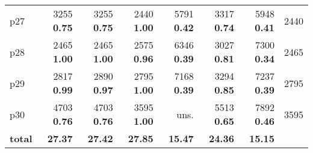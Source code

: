 \begin{tabular}{lrrrrrrr}
\multicolumn{1}{l|}{p27} & {\footnotesize 3255} \textbf{0.75} & {\footnotesize 3255} \textbf{0.75} & {\footnotesize 2440} \textbf{1.00} & {\footnotesize 5791} \textbf{0.42} & {\footnotesize 3317} \textbf{0.74} & {\footnotesize 5948} \textbf{0.41} & \multicolumn{1}{|r}{2440}\\
\multicolumn{1}{l|}{p28} & {\footnotesize 2465} \textbf{1.00} & {\footnotesize 2465} \textbf{1.00} & {\footnotesize 2575} \textbf{0.96} & {\footnotesize 6346} \textbf{0.39} & {\footnotesize 3027} \textbf{0.81} & {\footnotesize 7300} \textbf{0.34} & \multicolumn{1}{|r}{2465}\\
\multicolumn{1}{l|}{p29} & {\footnotesize 2817} \textbf{0.99} & {\footnotesize 2890} \textbf{0.97} & {\footnotesize 2795} \textbf{1.00} & {\footnotesize 7168} \textbf{0.39} & {\footnotesize 3294} \textbf{0.85} & {\footnotesize 7237} \textbf{0.39} & \multicolumn{1}{|r}{2795}\\
\multicolumn{1}{l|}{p30} & {\footnotesize 4703} \textbf{0.76} & {\footnotesize 4703} \textbf{0.76} & {\footnotesize 3595} \textbf{1.00} & uns. & {\footnotesize 5513} \textbf{0.65} & {\footnotesize 7892} \textbf{0.46} & \multicolumn{1}{|r}{3595}\\
\midrule
\textbf{total} & \textbf{27.37} & \textbf{27.42} & \textbf{27.85} & \textbf{15.47} & \textbf{24.36} & \textbf{15.15} & \\
\bottomrule
\end{tabular}

